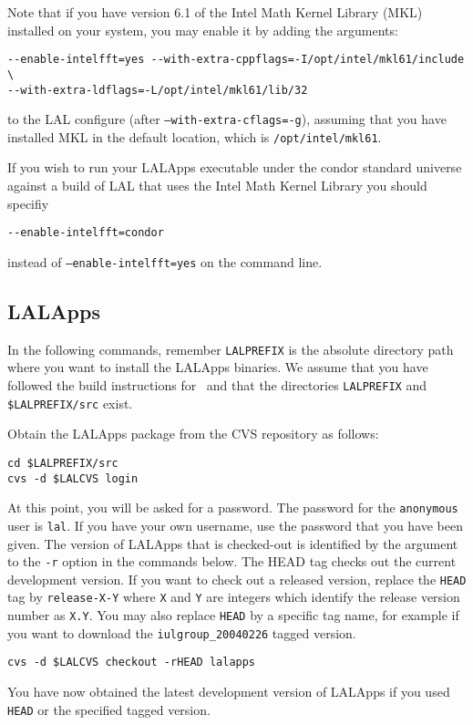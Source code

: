 Note that if you have version 6.1 of the Intel Math Kernel Library (MKL)
installed on your system, you may enable it by adding the arguments:
\begin{verbatim}
--enable-intelfft=yes --with-extra-cppflags=-I/opt/intel/mkl61/include \
--with-extra-ldflags=-L/opt/intel/mkl61/lib/32
\end{verbatim}
to the LAL configure (after \texttt{--with-extra-cflags=-g}), assuming that
you have installed MKL in the default location, which is
\texttt{/opt/intel/mkl61}.

If you wish to run your LALApps executable under the condor standard universe
against a build of LAL that uses the Intel Math Kernel Library you should
specifiy
\begin{verbatim}
--enable-intelfft=condor
\end{verbatim}
instead of \texttt{--enable-intelfft=yes} on the command line.


\color{black}
\subsection{LALApps}
\color{black}

In the following commands, remember \verb+LALPREFIX+ is the absolute
directory path where you want to install the LALApps binaries.  We
assume that you have followed the build instructions for \lal\ and
that the directories \verb+LALPREFIX+ and \verb+$LALPREFIX/src+ exist.

Obtain the LALApps package from the CVS repository as follows:  
\begin{verbatim}
cd $LALPREFIX/src
cvs -d $LALCVS login
\end{verbatim}
At this point,  you will be asked for a password.  The password for the
\verb+anonymous+ user is \verb+lal+. If you have your own username, use the
password that you have been given.
The version of LALApps that is checked-out is identified by the argument
to the \texttt{-r} option in the commands below.   The HEAD tag checks out the
current development version.  If you want to check out a released
version, replace the \verb+HEAD+ tag by \verb+release-X-Y+ where
\verb+X+ and \verb+Y+ are integers which identify the release version
number as \verb+X.Y+. You may also replace \verb+HEAD+ by a specific tag name,
for example if you want to download the \verb+iulgroup_20040226+ tagged
version.
\begin{verbatim}
cvs -d $LALCVS checkout -rHEAD lalapps
\end{verbatim}
You have now obtained the latest development version of LALApps if you used
\verb+HEAD+ or the specified tagged version.

